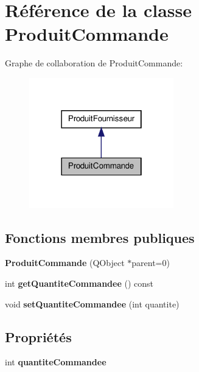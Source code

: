 \hypertarget{class_produit_commande}{
\section{Référence de la classe ProduitCommande}
\label{db/d8b/class_produit_commande}
}


Graphe de collaboration de ProduitCommande:\nopagebreak
\begin{figure}[H]
\begin{center}
\leavevmode
\includegraphics[width=178pt]{d9/d44/class_produit_commande__coll__graph}
\end{center}
\end{figure}
\subsection*{Fonctions membres publiques}
\begin{DoxyCompactItemize}
\item 
\hypertarget{class_produit_commande_a3551c24e7d3a8b0ead146187b87ea919}{
{\bfseries ProduitCommande} (QObject $\ast$parent=0)}
\label{db/d8b/class_produit_commande_a3551c24e7d3a8b0ead146187b87ea919}

\item 
\hypertarget{class_produit_commande_a2e22727c78c05682742d03e3793a6f77}{
int {\bfseries getQuantiteCommandee} () const }
\label{db/d8b/class_produit_commande_a2e22727c78c05682742d03e3793a6f77}

\item 
\hypertarget{class_produit_commande_a8965e5d3ed457053a99db8cc02f0cd86}{
void {\bfseries setQuantiteCommandee} (int quantite)}
\label{db/d8b/class_produit_commande_a8965e5d3ed457053a99db8cc02f0cd86}

\end{DoxyCompactItemize}
\subsection*{Propriétés}
\begin{DoxyCompactItemize}
\item 
\hypertarget{class_produit_commande_aa27749b29a2c70785327ac25d4a34343}{
int {\bfseries quantiteCommandee}}
\label{db/d8b/class_produit_commande_aa27749b29a2c70785327ac25d4a34343}

\end{DoxyCompactItemize}


